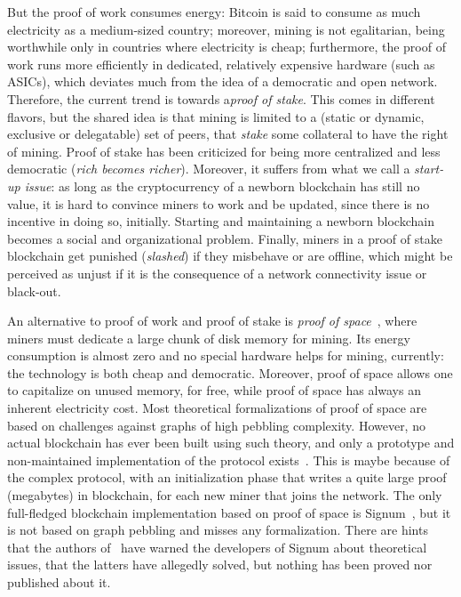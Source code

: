 But the proof of work consumes energy: Bitcoin is said to consume as much electricity as
a medium-sized country; moreover, mining is not egalitarian, being
worthwhile only in countries where electricity is cheap; furthermore, the proof of work
runs more efficiently in dedicated, relatively expensive hardware (such as ASICs),
which deviates much from the idea of a democratic and open network.
Therefore, the current trend is towards a\emph{proof of stake}.
This comes in different flavors, but
the shared idea is that mining is limited to a (static or dynamic, exclusive or delegatable)
set of peers, that \emph{stake} some collateral to have the right of mining.
Proof of stake has been criticized for being more centralized and less democratic
(\emph{rich becomes richer}).
Moreover, it suffers from what we call a \emph{start-up issue}: as long as the cryptocurrency
of a newborn blockchain has still no value, it is hard to convince miners to work and
be updated, since there is no incentive in doing so, initially. Starting and maintaining
a newborn blockchain becomes a social and organizational problem. Finally, miners in
a proof of stake blockchain get punished (\emph{slashed}) if they misbehave or are offline, which
might be perceived as unjust if it is the consequence of a network connectivity issue or black-out.

An alternative to proof of work and proof of stake is
\emph{proof of space}~\cite{AtenieseBFG14,DziembowskiFKP15}, where
miners must dedicate a large chunk of disk memory for mining.
Its energy consumption is almost zero and no special
hardware helps for mining, currently: the technology is both cheap
and democratic. Moreover, proof of space allows
one to capitalize on unused memory, for free, while proof of space has always an
inherent electricity cost. Most theoretical formalizations of proof of space are
based on challenges against graphs of high pebbling complexity. However, no actual blockchain
has ever been built using such theory, and only a prototype and non-maintained
implementation of the protocol exists~\cite{ParkKFGAP18}. This is maybe because of the
complex protocol, with an initialization phase
that writes a quite large proof (megabytes) in blockchain,
for each new miner that joins the network.
The only full-fledged blockchain
implementation based on proof of space is Signum~\cite{Signum}, but it is not
based on graph pebbling and misses any formalization.
There are hints that the authors of~\cite{ParkKFGAP18} have warned the developers of Signum about
theoretical issues, that the latters have allegedly solved,
but nothing has been proved nor published about it.

